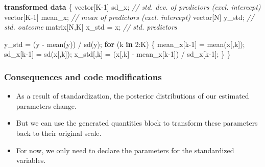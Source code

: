 \documentclass[
  11pt,
]{article}
\newenvironment{Shaded}{\begin{snugshade}}{\end{snugshade}}
\newcommand{\CommentTok}[1]{\textcolor[rgb]{0.56,0.35,0.01}{\textit{#1}}}
\newcommand{\ControlFlowTok}[1]{\textcolor[rgb]{0.13,0.29,0.53}{\textbf{#1}}}
\newcommand{\DataTypeTok}[1]{\textcolor[rgb]{0.13,0.29,0.53}{#1}}
\newcommand{\DecValTok}[1]{\textcolor[rgb]{0.00,0.00,0.81}{#1}}
\newcommand{\KeywordTok}[1]{\textcolor[rgb]{0.13,0.29,0.53}{\textbf{#1}}}
\newcommand{\NormalTok}[1]{#1}
\providecommand{\tightlist}{%
  \setlength{\itemsep}{0pt}\setlength{\parskip}{0pt}}
\begin{document}
\begin{Shaded}
\begin{Highlighting}[]
\KeywordTok{transformed data}\NormalTok{ \{}
  \DataTypeTok{vector}\NormalTok{[K}\DecValTok{{-}1}\NormalTok{] sd\_x;       }\CommentTok{// std. dev. of predictors (excl. intercept)}
  \DataTypeTok{vector}\NormalTok{[K}\DecValTok{{-}1}\NormalTok{] mean\_x;     }\CommentTok{// mean of predictors (excl. intercept)}
  \DataTypeTok{vector}\NormalTok{[N] y\_std;        }\CommentTok{// std. outcome }
  \DataTypeTok{matrix}\NormalTok{[N,K] x\_std = x;  }\CommentTok{// std. predictors}
  
\NormalTok{  y\_std = (y {-} mean(y)) / sd(y);}
  \ControlFlowTok{for}\NormalTok{ (k }\ControlFlowTok{in} \DecValTok{2}\NormalTok{:K) \{}
\NormalTok{    mean\_x[k}\DecValTok{{-}1}\NormalTok{] = mean(x[,k]);}
\NormalTok{    sd\_x[k}\DecValTok{{-}1}\NormalTok{] = sd(x[,k]);}
\NormalTok{    x\_std[,k] = (x[,k] {-} mean\_x[k}\DecValTok{{-}1}\NormalTok{]) / sd\_x[k}\DecValTok{{-}1}\NormalTok{]; }
\NormalTok{  \}}
\NormalTok{\}}
\end{Highlighting}
\end{Shaded}

\hypertarget{consequences-and-code-modifications}{%
\subsubsection{Consequences and code modifications}\label{consequences-and-code-modifications}}

\begin{itemize}
\tightlist
\item
  As a result of standardization, the posterior distributions of our estimated parameters change.
\item
  But we can use the generated quantities block to transform these parameters back to their original scale.
\item
  For now, we only need to declare the parameters for the standardized variables.
\end{itemize}
\end{document}
